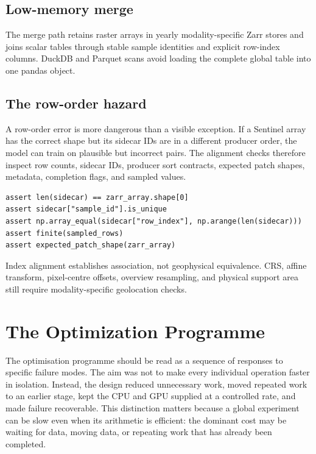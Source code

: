 \documentclass[12pt,a4paper]{report}
\newcommand{\feat}[1]{#1\par}
\begin{document}
\subsection{Low-memory merge}
The merge path retains raster arrays in yearly modality-specific Zarr stores
and joins scalar tables through stable sample identities and explicit row-index
columns. DuckDB and Parquet scans avoid loading the complete global table into
one pandas object.

\subsection{The row-order hazard}
A row-order error is more dangerous than a visible exception. If a Sentinel
array has the correct shape but its sidecar IDs are in a different producer
order, the model can train on plausible but incorrect pairs. The alignment
checks therefore inspect row counts, sidecar IDs, producer sort contracts,
expected patch shapes, metadata, completion flags, and sampled values.

\begin{lstlisting}[style=pycode, caption={Conceptual row-association validation}]
assert len(sidecar) == zarr_array.shape[0]
assert sidecar["sample_id"].is_unique
assert np.array_equal(sidecar["row_index"], np.arange(len(sidecar)))
assert finite(sampled_rows)
assert expected_patch_shape(zarr_array)
\end{lstlisting}

\feat{Index alignment establishes association, not geophysical equivalence.
CRS, affine transform, pixel-centre offsets, overview resampling, and physical
support area still require modality-specific geolocation checks.}

\section{The Optimization Programme}

The optimisation programme should be read as a sequence of responses to
specific failure modes. The aim was not to make every individual operation
faster in isolation. Instead, the design reduced unnecessary work, moved
repeated work to an earlier stage, kept the CPU and GPU supplied at a
controlled rate, and made failure recoverable. This distinction matters
because a global experiment can be slow even when its arithmetic is efficient:
the dominant cost may be waiting for data, moving data, or repeating work that
has already been completed.
\end{document}
